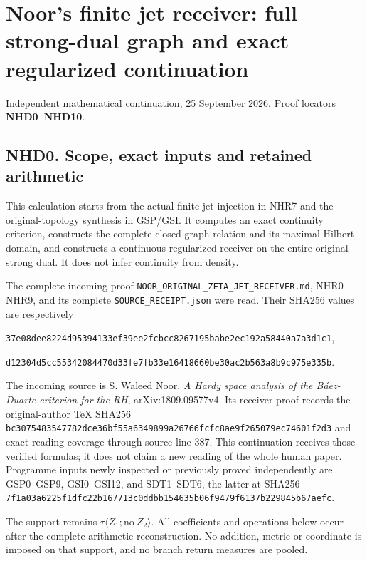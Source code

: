 \section{Noor's finite jet receiver: full strong-dual graph and exact
regularized
continuation}\label{noors-finite-jet-receiver-full-strong-dual-graph-and-exact-regularized-continuation}

Independent mathematical continuation, 25 September 2026. Proof locators
\textbf{NHD0--NHD10}.

\subsection{NHD0. Scope, exact inputs and retained
arithmetic}\label{nhd0.-scope-exact-inputs-and-retained-arithmetic}

This calculation starts from the actual finite-jet injection in NHR7 and
the original-topology synthesis in GSP/GSI. It computes an exact
continuity criterion, constructs the complete closed graph relation and
its maximal Hilbert domain, and constructs a continuous regularized
receiver on the entire original strong dual. It does not infer
continuity from density.

The complete incoming proof
\nolinkurl{NOOR_ORIGINAL_ZETA_JET_RECEIVER.md}, NHR0--NHR9, and its
complete \texttt{SOURCE\_RECEIPT.json} were read. Their SHA256 values
are respectively

\nolinkurl{37e08dee8224d95394133ef39ee2fcbcc8267195babe2ec192a58440a7a3d1c1},

\nolinkurl{d12304d5cc55342084470d33fe7fb33e16418660be30ac2b563a8b9c975e335b}.

The incoming source is S. Waleed Noor, \emph{A Hardy space analysis of
the Báez-Duarte criterion for the RH}, arXiv:1809.09577v4. Its receiver
proof records the original-author TeX SHA256
\nolinkurl{bc3075483547782dce36bf55a6349899a26766fcfc8ae9f265079ec74601f2d3}
and exact reading coverage through source line 387. This continuation
receives those verified formulas; it does not claim a new reading of the
whole human paper. Programme inputs newly inspected or previously proved
independently are GSP0--GSP9, GSI0--GSI12, and SDT1--SDT6, the latter at
SHA256
\nolinkurl{7f1a03a6225f1dfc22b167713c0ddbb154635b06f9479f6137b229845b67aefc}.

The support remains \(\tau\langle Z_1;\mathrm{no}\ Z_2\rangle\). All
coefficients and operations below occur after the complete arithmetic
reconstruction. No addition, metric or coordinate is imposed on that
support, and no branch return measures are pooled.

